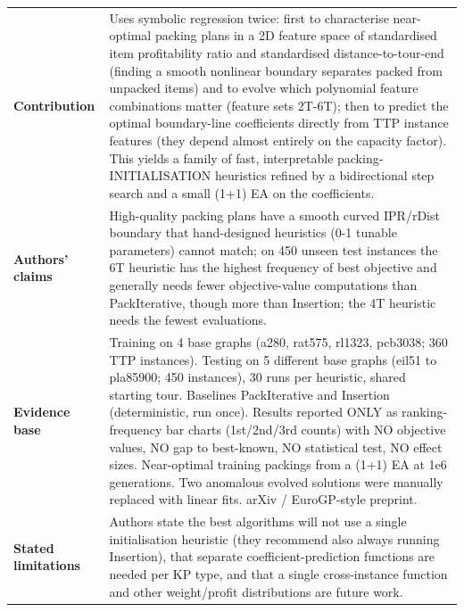 \documentclass[
  a4paper,
  11pt,
  headings=small,
  numbers=noenddot,
  abstract=on,
  parskip=half,
]{scrartcl}
\begin{document}
\begin{landscape}
\begin{longtable}{@{}p{2.6cm}p{8.7cm}p{2.6cm}p{8.7cm}@{}}
\textbf{Contribution} & \multicolumn{3}{p{20.0cm}}{Uses symbolic regression twice: first to characterise near-optimal packing plans in a 2D feature space of standardised item profitability ratio and standardised distance-to-tour-end (finding a smooth nonlinear boundary separates packed from unpacked items) and to evolve which polynomial feature combinations matter (feature sets 2T-6T); then to predict the optimal boundary-line coefficients directly from TTP instance features (they depend almost entirely on the capacity factor). This yields a family of fast, interpretable packing-INITIALISATION heuristics refined by a bidirectional step search and a small (1+1) EA on the coefficients.} \\
\textbf{Authors' claims} & \multicolumn{3}{p{20.0cm}}{High-quality packing plans have a smooth curved IPR/rDist boundary that hand-designed heuristics (0-1 tunable parameters) cannot match; on 450 unseen test instances the 6T heuristic has the highest frequency of best objective and generally needs fewer objective-value computations than PackIterative, though more than Insertion; the 4T heuristic needs the fewest evaluations.} \\
\textbf{Evidence base} & \multicolumn{3}{p{20.0cm}}{Training on 4 base graphs (a280, rat575, rl1323, pcb3038; 360 TTP instances). Testing on 5 different base graphs (eil51 to pla85900; 450 instances), 30 runs per heuristic, shared starting tour. Baselines PackIterative and Insertion (deterministic, run once). Results reported ONLY as ranking-frequency bar charts (1st/2nd/3rd counts) with NO objective values, NO gap to best-known, NO statistical test, NO effect sizes. Near-optimal training packings from a (1+1) EA at 1e6 generations. Two anomalous evolved solutions were manually replaced with linear fits. arXiv / EuroGP-style preprint.} \\
\textbf{Stated limitations} & \multicolumn{3}{p{20.0cm}}{Authors state the best algorithms will not use a single initialisation heuristic (they recommend also always running Insertion), that separate coefficient-prediction functions are needed per KP type, and that a single cross-instance function and other weight/profit distributions are future work.} \\

\end{longtable}
\end{landscape}
\end{document}
